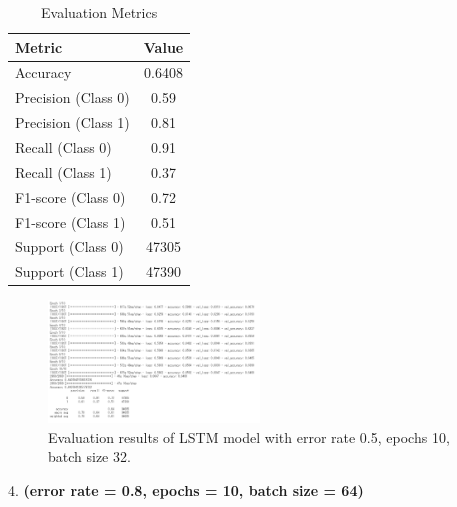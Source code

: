 \begin{table}[h!]
\centering
\caption{Evaluation Metrics}
\label{tab:evaluation_metrics}
\begin{tabular}{|l|c|}
\hline
\textbf{Metric} & \textbf{Value} \\
\hline
Accuracy        & 0.6408 \\
\hline
Precision (Class 0)       & 0.59 \\
\hline
Precision (Class 1)       & 0.81 \\
\hline
Recall (Class 0)       & 0.91 \\
\hline
Recall (Class 1)       & 0.37 \\
\hline
F1-score (Class 0)       & 0.72 \\
\hline
F1-score (Class 1)       & 0.51 \\
\hline
Support (Class 0)       & 47305 \\
\hline
Support (Class 1)       & 47390 \\
\hline
\end{tabular}
\end{table}

\begin{figure}[h!]
    \centering
    \includegraphics[width=0.5\textwidth]{Figures/ER50_epoch10_batch32.png}
    \caption{Evaluation results of LSTM model with error rate 0.5, epochs 10, batch size 32.}
    \label{fig:lstm_results_0.5_10_32}
\end{figure}

\vspace{100pt}

4. \textbf{(error rate = 0.8, epochs = 10, batch size = 64)}

